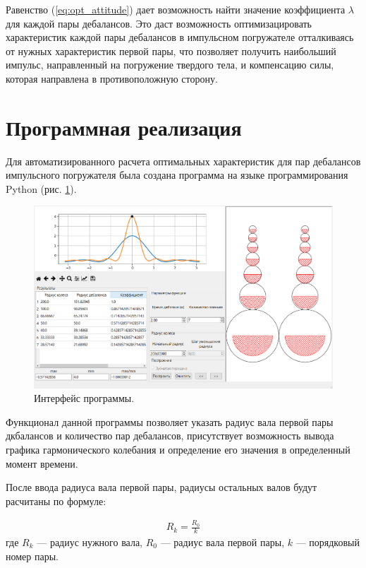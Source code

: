 Равенство (\ref{eq:opt_attitude}) дает возможность найти значение коэффициента $\lambda$ для каждой пары дебалансов.
Это даст возможность оптимизацировать характеристик каждой пары дебалансов
в импульсном погружателе отталкиваясь от нужных характеристик первой пары, что позволяет получить наибольший импульс,
направленный на погружение твердого тела, и компенсацию силы, которая направлена в противоположную сторону.


\clearpage
\section{Программная реализация}
Для автоматизированного расчета оптимальных характеристик для пар дебалансов импульсного погружателя
была создана программа на языке программирования Python (рис. \ref{fig:xolm_2}).

\begin{figure}[h]
    \centering
    \includegraphics[width=1\linewidth]{img/xolm_2.png}
    \caption{Интерфейс программы.}
    \label{fig:xolm_2}
\end{figure}

Функционал данной программы позволяет указать радиус вала первой пары дкбалансов и количество пар дебалансов,
присутствует возможность вывода графика гармонического колебания и определение его значения в определенный момент времени.

После ввода радиуса вала первой пары, радиусы остальных валов будут расчитаны по формуле:

\begin{equation}\label{eq:deb_rad}
    \begin{gathered}
        R_k = \frac{R_0}{k}
    \end{gathered}
\end{equation}
\noindent где $R_k$ --- радиус нужного вала, $R_0$ --- радиус вала первой пары, $k$ --- порядковый номер пары.

